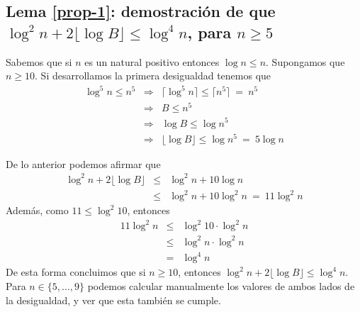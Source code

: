\subsection{Lema \ref{prop-1}: demostración de que $\log^2 n + 2\lfloor \log B \rfloor \leq \log^4 n$, para $n\geq 5$}
\label{app-prop-1}
Sabemos que si $n$ es un natural positivo entonces $\log n \leq n$. Supongamos que $n\geq 10$. Si desarrollamos la primera desigualdad tenemos que 
\begin{eqnarray*}
\log^5 n \leq n^5 &\Rightarrow& \lceil\log^5 n\rceil \leq \lceil n^5\rceil \ = \ n^5\\
	&\Rightarrow& B \leq n^5\\
	&\Rightarrow& \log B  \leq \log {n^5}\\
	&\Rightarrow& \lfloor\log B\rfloor  \leq \log {n^5} \ = \ 5\log n	 
\end{eqnarray*}

De lo anterior podemos afirmar que
\begin{eqnarray*}
	\log^2 n + 2\lfloor \log B \rfloor
	&\leq& \log^2 n + 10\log n\\
	&\leq& \log^2 n + 10\log^2 n \ = \ 11\log^2 n
\end{eqnarray*}
Además, como $11\leq\log^2 10$, entonces
\begin{eqnarray*}
	11\log^2 n &\leq& \log^2 10 \cdot\log^2 n\\
	&\leq& \log^2n\cdot \log^2n\\
	&=& \log^4 n
\end{eqnarray*}
De esta forma concluimos que si $n\geq 10$, entonces $\log^2 n + 2\lfloor \log B \rfloor \leq \log^4 n$. Para $n\in \{5,\ldots, 9\}$ podemos calcular manualmente los valores de ambos lados de la desigualdad, y ver que esta también se cumple.


